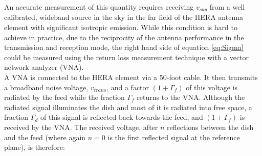\documentclass[twocolumn]{emulateapj}
\newcommand{\volt}{{v}}
\newcommand{\dfngexp}{{e^{2\pi i\nu \Delta \tau}}}
\begin{document}

An accurate measurement of this quantity requires receiving $v_{sky}$ from a well calibrated, wideband source in the sky in the far field of the HERA antenna element with significant isotropic emission. While this condition is hard to achieve in practice, due to the reciprocity of the antenna performance in the transmission and reception mode, the right hand side of equation \ref{eq:Sigma} could be measured using the return loss measurement technique with a vector network analyzer (VNA). \\
\indent A VNA is connected to the HERA element via a 50-foot cable. It then transmits a broadband noise voltage, $\volt_{trans}$, and a factor $(1+\Gamma_f)$ of this voltage is radiated by the feed while the fraction $\Gamma_{f}$ returns to the VNA. Although the radiated signal illuminates the dish and most of it is radiated into free space, a fraction $\Gamma_d$ of this signal is reflected back towards the feed, and $(1+\Gamma_f)$ is received by the VNA.  The received voltage, after $n$ reflections between the dish and the feed (where again $n=0$ is the first reflected signal at the reference plane), is therefore:
\end{document}
